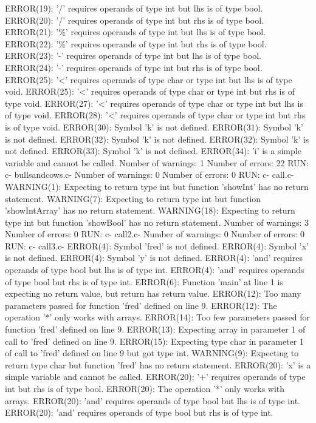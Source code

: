 \documentclass[12pt]{book}
\begin{document}
ERROR(19): '/' requires operands of type int but lhs is of type bool.
ERROR(20): '/' requires operands of type int but rhs is of type bool.
ERROR(21): '\%' requires operands of type int but lhs is of type bool.
ERROR(22): '\%' requires operands of type int but rhs is of type bool.
ERROR(23): '-' requires operands of type int but lhs is of type bool.
ERROR(24): '-' requires operands of type int but rhs is of type bool.
ERROR(25): '<' requires operands of type char or type int but lhs is of type void.
ERROR(25): '<' requires operands of type char or type int but rhs is of type void.
ERROR(27): '<' requires operands of type char or type int but lhs is of type void.
ERROR(28): '<' requires operands of type char or type int but rhs is of type void.
ERROR(30): Symbol 'k' is not defined.
ERROR(31): Symbol 'k' is not defined.
ERROR(32): Symbol 'k' is not defined.
ERROR(32): Symbol 'k' is not defined.
ERROR(33): Symbol 'k' is not defined.
ERROR(34): 'i' is a simple variable and cannot be called.
Number of warnings: 1
Number of errors: 22
RUN: c- bullsandcows.c-
Number of warnings: 0
Number of errors: 0
RUN: c- call.c-
WARNING(1): Expecting to return type int but function 'showInt' has no return statement.
WARNING(7): Expecting to return type int but function 'showIntArray' has no return statement.
WARNING(18): Expecting to return type int but function 'showBool' has no return statement.
Number of warnings: 3
Number of errors: 0
RUN: c- call2.c-
Number of warnings: 0
Number of errors: 0
RUN: c- call3.c-
ERROR(4): Symbol 'fred' is not defined.
ERROR(4): Symbol 'x' is not defined.
ERROR(4): Symbol 'y' is not defined.
ERROR(4): 'and' requires operands of type bool but lhs is of type int.
ERROR(4): 'and' requires operands of type bool but rhs is of type int.
ERROR(6): Function 'main' at line 1 is expecting no return value, but return has return value.
ERROR(12): Too many parameters passed for function 'fred' defined on line 9.
ERROR(12): The operation '*' only works with arrays.
ERROR(14): Too few parameters passed for function 'fred' defined on line 9.
ERROR(13): Expecting array in parameter 1 of call to 'fred' defined on line 9.
ERROR(15): Expecting type char in parameter 1 of call to 'fred' defined on line 9 but got type int.
WARNING(9): Expecting to return type char but function 'fred' has no return statement.
ERROR(20): 'x' is a simple variable and cannot be called.
ERROR(20): '+' requires operands of type int but rhs is of type bool.
ERROR(20): The operation '*' only works with arrays.
ERROR(20): 'and' requires operands of type bool but lhs is of type int.
ERROR(20): 'and' requires operands of type bool but rhs is of type int.
\end{document}
